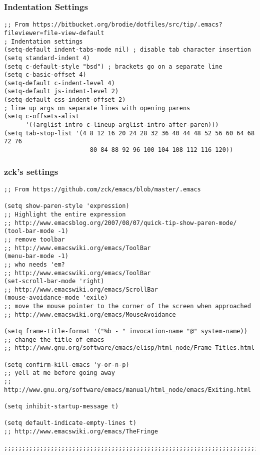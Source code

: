 \documentclass[11pt]{article}
\begin{document}
\subsubsection{Indentation Settings}
\label{sec:org6442d6e}
\begin{verbatim}
;; From https://bitbucket.org/brodie/dotfiles/src/tip/.emacs?fileviewer=file-view-default
; Indentation settings
(setq-default indent-tabs-mode nil) ; disable tab character insertion
(setq standard-indent 4)
(setq c-default-style "bsd") ; brackets go on a separate line
(setq c-basic-offset 4)
(setq-default c-indent-level 4)
(setq-default js-indent-level 2)
(setq-default css-indent-offset 2)
; line up args on separate lines with opening parens
(setq c-offsets-alist
      '((arglist-intro c-lineup-arglist-intro-after-paren)))
(setq tab-stop-list '(4 8 12 16 20 24 28 32 36 40 44 48 52 56 60 64 68 72 76
                        80 84 88 92 96 100 104 108 112 116 120))
\end{verbatim}

\subsubsection{zck's settings}
\label{sec:org9faa2d1}

\begin{verbatim}
;; From https://github.com/zck/emacs/blob/master/.emacs

(setq show-paren-style 'expression)
;; Highlight the entire expression
;; http://www.emacsblog.org/2007/08/07/quick-tip-show-paren-mode/
(tool-bar-mode -1)
;; remove toolbar
;; http://www.emacswiki.org/emacs/ToolBar
(menu-bar-mode -1)
;; who needs 'em?
;; http://www.emacswiki.org/emacs/ToolBar
(set-scroll-bar-mode 'right)
;; http://www.emacswiki.org/emacs/ScrollBar
(mouse-avoidance-mode 'exile)
;; move the mouse pointer to the corner of the screen when approached
;; http://www.emacswiki.org/emacs/MouseAvoidance

(setq frame-title-format '("%b - " invocation-name "@" system-name))
;; change the title of emacs
;; http://www.gnu.org/software/emacs/elisp/html_node/Frame-Titles.html

(setq confirm-kill-emacs 'y-or-n-p)
;; yell at me before going away
;; http://www.gnu.org/software/emacs/manual/html_node/emacs/Exiting.html

(setq inhibit-startup-message t)

(setq default-indicate-empty-lines t)
;; http://www.emacswiki.org/emacs/TheFringe

;;;;;;;;;;;;;;;;;;;;;;;;;;;;;;;;;;;;;;;;;;;;;;;;;;;;;;;;;;;;;;;;;;;;;;;;;;;;;;;;;;;;;;;;;;;;;;

\end{verbatim}
\end{document}

